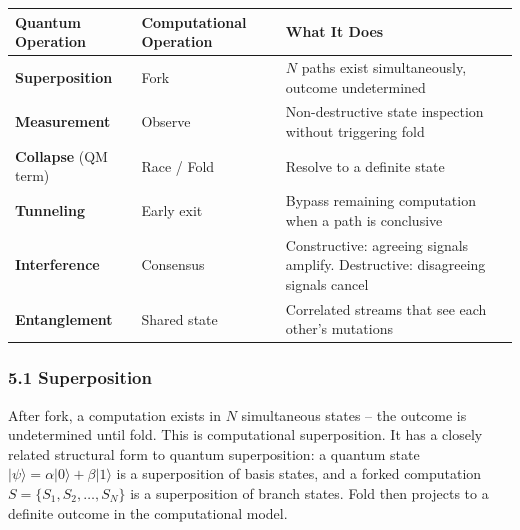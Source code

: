 \documentclass[
  11pt,
]{article}
\newcounter{none} %
\begin{document}
{\def\LTcaptype{none} %
\begin{longtable}[]{@{}
  >{\raggedright\arraybackslash}p{}
  >{\raggedright\arraybackslash}p{}
  >{\raggedright\arraybackslash}p{}@{}}
\toprule\noalign{}
\begin{minipage}[b]{\linewidth}\raggedright
Quantum Operation
\end{minipage} & \begin{minipage}[b]{\linewidth}\raggedright
Computational Operation
\end{minipage} & \begin{minipage}[b]{\linewidth}\raggedright
What It Does
\end{minipage} \\
\midrule\noalign{}
\endhead
\bottomrule\noalign{}
\endlastfoot
\textbf{Superposition} & Fork & \(N\) paths exist simultaneously,
outcome undetermined \\
\textbf{Measurement} & Observe & Non-destructive state inspection
without triggering fold \\
\textbf{Collapse} (QM term) & Race / Fold & Resolve to a definite
state \\
\textbf{Tunneling} & Early exit & Bypass remaining computation when a
path is conclusive \\
\textbf{Interference} & Consensus & Constructive: agreeing signals
amplify. Destructive: disagreeing signals cancel \\
\textbf{Entanglement} & Shared state & Correlated streams that see each
other's mutations \\
\end{longtable}
}

\subsubsection{5.1 Superposition}\label{superposition}

After fork, a computation exists in \(N\) simultaneous states -- the
outcome is undetermined until fold. This is computational superposition.
It has a closely related structural form to quantum superposition: a
quantum state \(|\psi\rangle = \alpha|0\rangle + \beta|1\rangle\) is a
superposition of basis states, and a forked computation
\(S = \{S_1, S_2, \ldots, S_N\}\) is a superposition of branch states.
Fold then projects to a definite outcome in the computational model.
\end{document}
